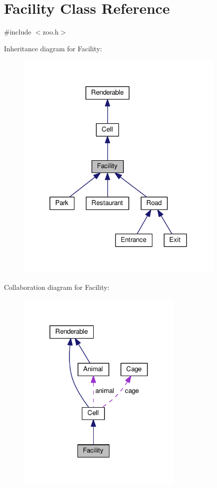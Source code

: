 \hypertarget{classFacility}{}\section{Facility Class Reference}
\label{classFacility}


{\ttfamily \#include $<$zoo.\+h$>$}



Inheritance diagram for Facility\+:
\nopagebreak
\begin{figure}[H]
\begin{center}
\leavevmode
\includegraphics[width=288pt]{classFacility__inherit__graph}
\end{center}
\end{figure}


Collaboration diagram for Facility\+:
\nopagebreak
\begin{figure}[H]
\begin{center}
\leavevmode
\includegraphics[width=228pt]{classFacility__coll__graph}
\end{center}
\end{figure}
